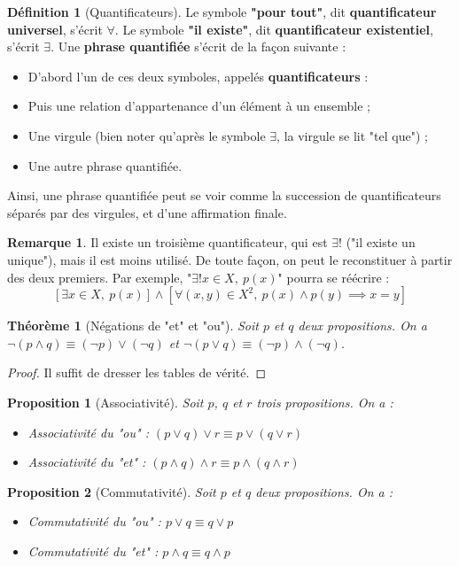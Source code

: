 \documentclass[french]{book}
\theoremstyle{plain}
\newtheorem{thm}{Théorème}[chapter]
\newtheorem{prop}{Proposition}[chapter]
\theoremstyle{definition}
\newtheorem{dfn}{Définition}[chapter]
\newtheorem{rmq}{Remarque}[chapter]
\theoremstyle{remark}
\begin{document}
\begin{dfn}[Quantificateurs]
	Le symbole \textbf{"pour tout"}, dit \textbf{quantificateur universel}, s'écrit $\forall$. Le symbole \textbf{"il existe"}, dit \textbf{quantificateur existentiel}, s'écrit $\exists$. Une \textbf{phrase quantifiée} s'écrit de la façon suivante : 
	\begin{itemize}
		\item D'abord l'un de ces deux symboles, appelés \textbf{quantificateurs} :
		\item Puis une relation d'appartenance d'un élément à un ensemble ;
		\item Une virgule (bien noter qu'après le symbole $\exists$, la virgule se lit "tel que") ;
		\item Une autre phrase quantifiée.
	\end{itemize}
	Ainsi, une phrase quantifiée peut se voir comme la succession de quantificateurs séparés par des virgules, et d'une affirmation finale.
\end{dfn}
\begin{rmq}
	Il existe un troisième quantificateur, qui est $\exists!$ ("il existe un unique"), mais il est moins utilisé. De toute façon, on peut le reconstituer à partir des deux premiers. Par exemple, "$\exists!x\in X,\ p(x)$" pourra se réécrire : $$\left[\exists x\in X,\ p(x)\right]\land\left[\forall(x,y)\in X^2,\ p(x)\land p(y)\implies x=y\right]$$
\end{rmq}
\begin{thm}[Négations de "et" et "ou"]
	Soit $p$ et $q$ deux propositions. On a $\lnot(p\land q)\equiv(\lnot p)\lor(\lnot q)$ et $\lnot(p\lor q)\equiv(\lnot p)\land(\lnot q)$.
\end{thm}
\begin{proof}
	Il suffit de dresser les tables de vérité.
\end{proof}
\begin{prop}[Associativité]
	Soit $p$, $q$ et $r$ trois propositions. On a :
	\begin{itemize}
		\item Associativité du "ou" : $(p\lor q)\lor r\equiv p\lor(q\lor r)$
		\item Associativité du "et" : $(p\land q)\land r\equiv p\land(q\land r)$
	\end{itemize}
\end{prop}
\begin{prop}[Commutativité]
	Soit $p$ et $q$ deux propositions. On a :
	\begin{itemize}
		\item Commutativité du "ou" : $p\lor q\equiv q\lor p$
		\item Commutativité du "et" : $p\land q\equiv q\land p$
	\end{itemize}
\end{prop}
\end{document}
